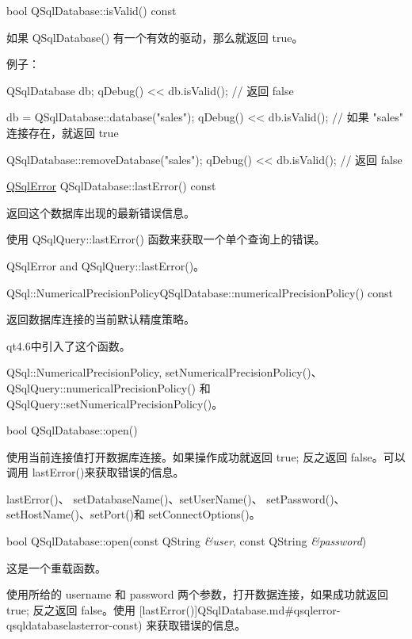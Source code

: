bool QSqlDatabase::isValid() const


如果 QSqlDatabase() 有一个有效的驱动，那么就返回 true。

例子：

\begin{cppcode}
QSqlDatabase db;
qDebug() << db.isValid();    // 返回 false

db = QSqlDatabase::database("sales");
qDebug() << db.isValid();    // 如果 "sales" 连接存在，就返回 true

QSqlDatabase::removeDatabase("sales");
qDebug() << db.isValid();    // 返回 false
\end{cppcode}

\href{https://doc.qt.io/qt-5/qsqlerror.html}{QSqlError} QSqlDatabase::lastError() const

返回这个数据库出现的最新错误信息。

使用 QSqlQuery::lastError() 函数来获取一个单个查询上的错误。

\begin{seeAlso}
QSqlError and QSqlQuery::lastError()。
\end{seeAlso}


QSql::NumericalPrecisionPolicyQSqlDatabase::numericalPrecisionPolicy() const

返回数据库连接的当前默认精度策略。

qt4.6中引入了这个函数。

\begin{seeAlso}
QSql::NumericalPrecisionPolicy, setNumericalPrecisionPolicy()、
QSqlQuery::numericalPrecisionPolicy() 和 QSqlQuery::setNumericalPrecisionPolicy()。
\end{seeAlso}

bool QSqlDatabase::open()

使用当前连接值打开数据库连接。如果操作成功就返回 true; 反之返回 false。可以调用 lastError()来获取错误的信息。

\begin{seeAlso}
lastError()、 setDatabaseName()、setUserName()、
setPassword()、setHostName()、setPort()和 setConnectOptions()。
\end{seeAlso}

bool QSqlDatabase::open(const QString \emph{\&user}, const QString \emph{\&password})

这是一个重载函数。

使用所给的 username 和 password 两个参数，打开数据连接，如果成功就返回 true; 反之返回 false。使用 [lastError()]QSqlDatabase.md\#qsqlerror-qsqldatabaselasterror-const) 来获取错误的信息。

